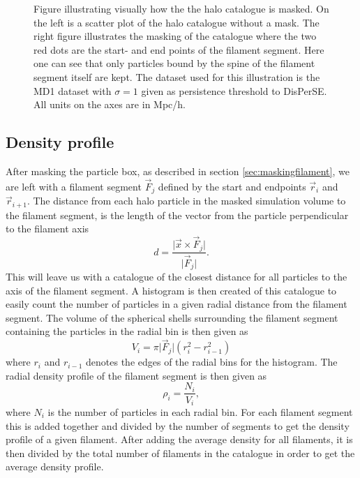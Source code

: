 \begin{figure}[htbp]
    \hspace{1em}%
    \caption{Figure illustrating visually how the the halo catalogue is masked. On the left is a scatter plot of the halo catalogue without a mask. The right figure illustrates the masking of the catalogue where the two red dots are the start- and end points of the filament segment. Here one can see that only particles bound by the spine of the filament segment itself are kept. The dataset used for this illustration is the MD1 dataset with $\sigma=1$ given as persistence threshold to DisPerSE. All units on the axes are in Mpc/h.}
    \label{fig:galaxy_catbbox}
\end{figure}
\subsection{Density profile}\label{sec:filamentdensity}
After masking the particle box, as described in section \ref{sec:maskingfilament},
we are left with a filament segment $\vec{F}_j$ defined by the start and
endpoints $\vec{r}_{i}$ and $\vec{r}_{i+1}$. The distance from each halo particle in
the masked simulation volume to the filament segment, is the length of the vector
from the particle perpendicular to the filament axis
\begin{equation}\label{eq:distance_from_filament}
    d=\frac{\vert \vec{x}\times\vec{F}_j\vert}{\vert \vec{F}_j\vert}.
\end{equation}
This will leave us with a catalogue of the closest distance for all particles to
the axis of the filament segment. A histogram is then created of this catalogue
to easily count the number of particles in a given radial distance from the
filament segment. The volume of the spherical shells surrounding the filament segment
containing the particles in the radial bin is then given as
\begin{equation}
    V_i={\pi\vert \vec{F}_j\vert(r_i^2-r_{i-1}^2)}
\end{equation}
where $r_i$ and $r_{i-1}$ denotes the edges of the radial bins for the histogram.
The radial density profile of the filament segment is then given as
\begin{equation}
    \rho_i=\frac{N_i}{V_i},
\end{equation}
where $N_i$ is the number of particles in each radial bin. For each filament segment
this is added together and divided by the number of segments to get the density profile of a given filament. After adding the average density for all filaments, it is then divided by the total number of filaments in the catalogue in order to get the average density profile.
